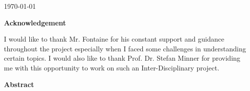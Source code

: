 \documentclass[a4paper, 12pt]{article}
\begin{document}
\begin{titlepage}


{\large \today}\\[2cm] %

\end{titlepage}

\begin{center}
\huge \bfseries Acknowledgement
\end{center}
\thispagestyle{empty}
\vspace{35mm}
I would like to thank Mr. Fontaine for his constant support and guidance throughout the project especially when I faced some challenges in understanding certain topics. I would also like to thank Prof. Dr. Stefan Minner for providing me with this opportunity to work on such an Inter-Disciplinary project.

\newpage

\begin{center}
\huge \bfseries Abstract
\end{center}
\thispagestyle{empty}
\vspace{35mm}
\end{document}

